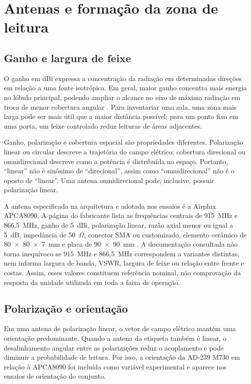\section{Antenas e formação da zona de leitura}

\subsection{Ganho e largura de feixe}

O ganho em dBi expressa a concentração da radiação em determinadas direções em relação a uma fonte isotrópica. Em geral, maior ganho concentra mais energia no lóbulo principal, podendo ampliar o alcance no eixo de máxima radiação em troca de menor cobertura angular \cite{rao2005uhf}. Para inventariar uma sala, uma zona mais larga pode ser mais útil que a maior distância possível; para um ponto fixo em uma porta, um feixe controlado reduz leituras de áreas adjacentes.

Ganho, polarização e cobertura espacial são propriedades diferentes. Polarização linear ou circular descreve a trajetória do campo elétrico; cobertura direcional ou omnidirecional descreve como a potência é distribuída no espaço. Portanto, ``linear'' não é sinônimo de ``direcional'', assim como ``omnidirecional'' não é o oposto de ``linear''. Uma antena omnidirecional pode, inclusive, possuir polarização linear.

A antena especificada na arquitetura e adotada nos ensaios é a Airplux APCA8090. A página do fabricante lista as frequências centrais de 915~MHz e 866,5~MHz, ganho de 5~dBi, polarização linear, razão axial menor ou igual a 5~dB, impedância de 50~$\Omega$, conector SMA ou customizado, elemento cerâmico de 80~$\times$~80~$\times$~7~mm e placa de 90~$\times$~90~mm \cite{airplux2026apca8090}. A documentação consultada não torna inequívoco se 915~MHz e 866,5~MHz correspondem a variantes distintas, nem informa largura de banda, VSWR, largura de feixe ou relação entre frente e costas. Assim, esses valores constituem referência nominal, não comprovação da resposta da unidade utilizada em toda a faixa de operação.

\subsection{Polarização e orientação}

Em uma antena de polarização linear, o vetor de campo elétrico mantém uma orientação predominante. Quando a antena da etiqueta também é linear, o desalinhamento angular entre as polarizações reduz o acoplamento e pode diminuir a probabilidade de leitura. Por isso, a orientação da AD-239 M730 em relação à APCA8090 foi incluída como variável experimental e aparece nos ensaios de orientação do conjunto.

